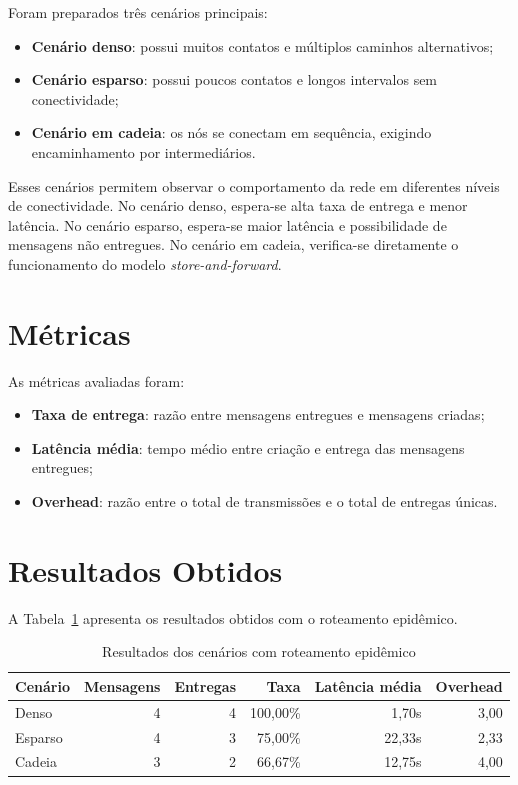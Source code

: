\documentclass[12pt,a4paper]{article}
\begin{document}
Foram preparados três cenários principais:

\begin{itemize}
  \item \textbf{Cenário denso}: possui muitos contatos e múltiplos caminhos alternativos;
  \item \textbf{Cenário esparso}: possui poucos contatos e longos intervalos sem conectividade;
  \item \textbf{Cenário em cadeia}: os nós se conectam em sequência, exigindo encaminhamento por intermediários.
\end{itemize}

Esses cenários permitem observar o comportamento da rede em diferentes níveis de conectividade.
No cenário denso, espera-se alta taxa de entrega e menor latência. No cenário esparso,
espera-se maior latência e possibilidade de mensagens não entregues. No cenário em cadeia,
verifica-se diretamente o funcionamento do modelo \textit{store-and-forward}.

\section{Métricas}

As métricas avaliadas foram:

\begin{itemize}
  \item \textbf{Taxa de entrega}: razão entre mensagens entregues e mensagens criadas;
  \item \textbf{Latência média}: tempo médio entre criação e entrega das mensagens entregues;
  \item \textbf{Overhead}: razão entre o total de transmissões e o total de entregas únicas.
\end{itemize}

\section{Resultados Obtidos}

A Tabela~\ref{tab:resultados} apresenta os resultados obtidos com o roteamento epidêmico.

\begin{table}[h]
\centering
\caption{Resultados dos cenários com roteamento epidêmico}
\label{tab:resultados}
\begin{tabular}{lrrrrr}
\toprule
\textbf{Cenário} & \textbf{Mensagens} & \textbf{Entregas} & \textbf{Taxa} & \textbf{Latência média} & \textbf{Overhead} \\
\midrule
Denso & 4 & 4 & 100,00\% & 1,70s & 3,00 \\
Esparso & 4 & 3 & 75,00\% & 22,33s & 2,33 \\
Cadeia & 3 & 2 & 66,67\% & 12,75s & 4,00 \\
\bottomrule
\end{tabular}
\end{table}
\end{document}

